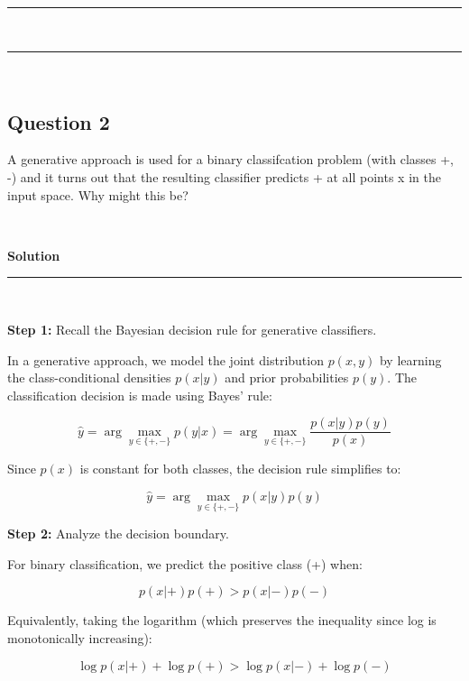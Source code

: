 \documentclass{article}
\begin{document}
\noindent\rule{\textwidth}{0.4pt}\\

\noindent\rule{\textwidth}{0.4pt}\\

\newpage
\subsection*{Question 2}
\parbox{\textwidth}{A generative approach is used for a binary classifcation problem (with classes +, -) and it turns out
that the resulting classifier predicts + at all points x in the input space. Why might this be?}\\

\parbox{\textwidth}{\textbf{Solution}}
\noindent\rule{\textwidth}{0.4pt}\\

\parbox{\textwidth}{\textbf{Step 1:} Recall the Bayesian decision rule for generative classifiers.}

\vspace{0.2cm}

\parbox{\textwidth}{In a generative approach, we model the joint distribution $p(x, y)$ by learning the class-conditional densities $p(x|y)$ and prior probabilities $p(y)$. The classification decision is made using Bayes' rule:}

$$\hat{y} = \arg\max_{y \in \{+,-\}} p(y|x) = \arg\max_{y \in \{+,-\}} \frac{p(x|y)p(y)}{p(x)}$$

\parbox{\textwidth}{Since $p(x)$ is constant for both classes, the decision rule simplifies to:}

$$\hat{y} = \arg\max_{y \in \{+,-\}} p(x|y)p(y)$$

\vspace{0.3cm}

\parbox{\textwidth}{\textbf{Step 2:} Analyze the decision boundary.}

\vspace{0.2cm}

\parbox{\textwidth}{For binary classification, we predict the positive class (+) when:}

$$p(x|+)p(+) > p(x|-)p(-)$$

\parbox{\textwidth}{Equivalently, taking the logarithm (which preserves the inequality since log is monotonically increasing):}

$$\log p(x|+) + \log p(+) > \log p(x|-) + \log p(-)$$

\vspace{0.3cm}
\end{document}
